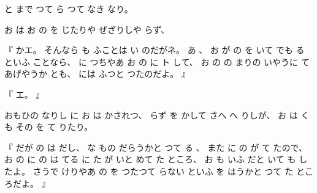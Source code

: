 %
と
まで
つて
ら
つて
なき
なり。

%
お
は
お
の
を
じたりや
ぜざりしや
らず、

%
『
かエ。
%
そんなら
も
ふことは
い
のだがネ。
%
あ
、
%
お
が
の
を
いて
でも
る
といふ
ことなら、
%
に
つちやあ
お
の
に
ト
して、
%
お
の
の
まりの
いやうに
て
あげやうか
とも、
には
ふつと
つたのだよ。
』

%
『
エ。
』

%
おもひの
なりし
に
お
は
かされつ、
%
らず
を%
かして
さへ
へ
りしが、
%
お
は
くも
その
を
て
りたり。

%
『
だが
の
は
だし、%
%
な
もの
だらうかと
つて
る
、
%
また
に
の
が
て
たので、
%
お
の
に
の
は
てる
に
た
が
いと
めて
た
ところ、
%
お
も
いふ
だと
いて
も
したよ。
%
さうで
けりやあ
の
を
つたつて
らない
といふ
を
はうかと
つて
た
ところだよ。
』


